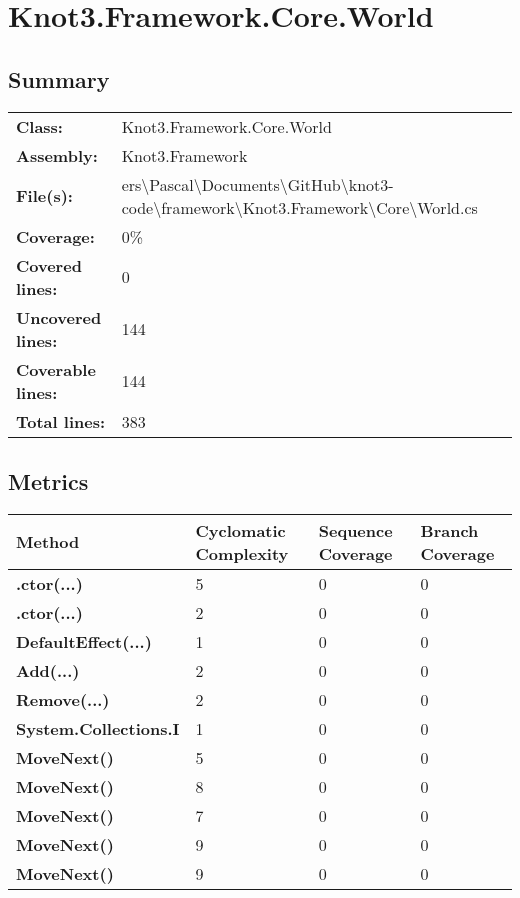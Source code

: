 \documentclass[a4paper,10pt]{article}
\begin{document}
\section{Knot3.Framework.Core.World}
\subsection{Summary}
\begin{longtable}[l]{ll}
\textbf{Class:} & Knot3.Framework.Core.World\\
\textbf{Assembly:} & Knot3.Framework\\
\textbf{File(s):} & \begin{minipage}[t]{12cm}{ers\textbackslash Pascal\textbackslash Documents\textbackslash GitHub\textbackslash knot3-code\textbackslash framework\textbackslash Knot3.Framework\textbackslash Core\textbackslash World.cs}\end{minipage} \\
\textbf{Coverage:} & 0\%\\
\textbf{Covered lines:} & 0\\
\textbf{Uncovered lines:} & 144\\
\textbf{Coverable lines:} & 144\\
\textbf{Total lines:} & 383\\
\end{longtable}
\subsection{Metrics}
\begin{longtable}[l]{|l|l|l|l|}
\hline
\textbf{Method} & \textbf{Cyclomatic Complexity} & \textbf{Sequence Coverage} & \textbf{Branch Coverage}\\
\hline
\textbf{.ctor(...)} & 5 & 0 & 0\\
\hline
\textbf{.ctor(...)} & 2 & 0 & 0\\
\hline
\textbf{DefaultEffect(...)} & 1 & 0 & 0\\
\hline
\textbf{Add(...)} & 2 & 0 & 0\\
\hline
\textbf{Remove(...)} & 2 & 0 & 0\\
\hline
\textbf{System.Collections.I} & 1 & 0 & 0\\
\hline
\textbf{MoveNext()} & 5 & 0 & 0\\
\hline
\textbf{MoveNext()} & 8 & 0 & 0\\
\hline
\textbf{MoveNext()} & 7 & 0 & 0\\
\hline
\textbf{MoveNext()} & 9 & 0 & 0\\
\hline
\textbf{MoveNext()} & 9 & 0 & 0\\
\hline
\end{longtable}
\end{document}
